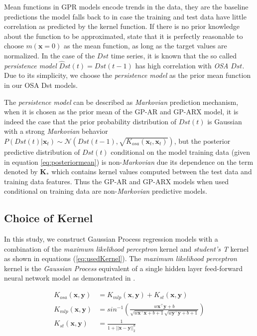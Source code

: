 Mean functions in GPR models encode trends in the data, they are the baseline predictions the model falls back to in case the training and test data have little correlation as predicted by the kernel function. If there is no prior knowledge about the function to be approximated, \cite{Rasmussen:2005:GPM:1162254} state that it is perfectly reasonable to choose $m(\mathbf{x} = 0)$ as the mean function, as long as the target values are normalized. In the case of the $Dst$ time series, it is known that the so called \emph{persistence model} $\hat{D}st(t) = Dst(t-1)$ has high correlation with \emph{OSA} $Dst$. Due to its simplicity, we choose the \emph{persistence model} as the prior mean function in our OSA Dst models. 

The \emph{persistence model} can be described as \emph{Markovian} prediction mechanism, when it is chosen as the prior mean of the GP-AR and GP-ARX model, it is indeed the case that the prior probability distribution of $Dst(t)$ is Gaussian with a strong \emph{Markovian} behavior $P(Dst(t)|\mathbf{x}_t) \sim \mathcal{N}(Dst(t-1), \sqrt{K_{osa}(\mathbf{x}_t, \mathbf{x}_t)})$, but the posterior predictive distribution of $Dst(t)$ conditional on the model training data (given in equation \ref{eq:posteriormean}) is non-\emph{Markovian} due its dependence on the term denoted by $\mathbf{K}_{*}$ which contains kernel values computed between the test data and training data features. Thus the GP-AR and GP-ARX models when used conditional on training data are non-\emph{Markovian} predictive models.

\subsection{Choice of Kernel}

In this study, we construct Gaussian Process regression models with a combination of the \emph{maximum likelihood perceptron} kernel and \emph{student's T} kernel as shown in equations (\ref{eq:usedKernel}). The \emph{maximum likelihood perceptron} kernel is the \emph{Gaussian Process} equivalent of a single hidden layer feed-forward neural network model as demonstrated in \cite{Neal:1996:BLN:525544}.

\begin{align}
    K_{osa}(\mathbf{x}, \mathbf{y}) & = K_{mlp}(\mathbf{x}, \mathbf{y}) + K_{st}(\mathbf{x}, \mathbf{y}) \label{eq:usedKernel} \\
    K_{mlp}(\mathbf{x}, \mathbf{y}) & = sin^{-1}(\frac{w\mathbf{x}^\intercal \mathbf{y} + b}{\sqrt{w\mathbf{x}^\intercal \mathbf{x} + b + 1} \sqrt{w\mathbf{y}^\intercal \mathbf{y} + b + 1}}) \\
    K_{st}(\mathbf{x}, \mathbf{y}) & = \frac{1}{1 + ||\mathbf{x} - \mathbf{y}||_{2}^d}
\end{align}

